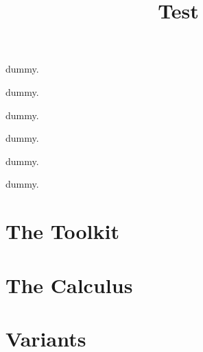 \documentclass[runningheads,envcountsect]{llncs}
\title{Test}\author{}\institute{}
\begin{document}
\maketitle
\newcommand{\dummytargets}{}
\begin{definition}\label{def:subst}dummy.\end{definition}
\begin{definition}\label{def:reachable}dummy.\end{definition}
\begin{theorem}\label{lem:multiple substitution}dummy.\end{theorem}
\begin{proposition}\label{prop:del-leftmost}dummy.\end{proposition}
\begin{proposition}\label{prop:kth}dummy.\end{proposition}
\begin{proposition}\label{prop:unary-once}dummy.\end{proposition}
\section{The Toolkit}\label{sec:toolkit}
\section{The Calculus}\label{sec:calculus}
\section{Variants}\label{sec:variants}



\end{document}
